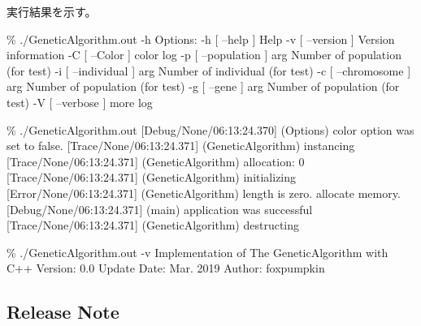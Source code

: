 実行結果を示す。


\begin{DoxyPre}
\% ./GeneticAlgorithm.out -h
Options:
  -h [ --help ]           Help
  -v [ --version ]        Version information
  -C [ --Color ]          color log
  -p [ --population ] arg Number of population (for test)
  -i [ --individual ] arg Number of individual (for test)
  -c [ --chromosome ] arg Number of population (for test)
  -g [ --gene ] arg       Number of population (for test)
  -V [ --verbose ]        more log
\end{DoxyPre}



\begin{DoxyPre}
\% ./GeneticAlgorithm.out
[Debug/None/06:13:24.370] (Options) color option was set to false.
[Trace/None/06:13:24.371] (GeneticAlgorithm) instancing
[Trace/None/06:13:24.371] (GeneticAlgorithm) allocation: 0
[Trace/None/06:13:24.371] (GeneticAlgorithm) initializing
[Error/None/06:13:24.371] (GeneticAlgorithm) length is zero. allocate memory.
[Debug/None/06:13:24.371] (main) application was successful
[Trace/None/06:13:24.371] (GeneticAlgorithm) destructing
\end{DoxyPre}



\begin{DoxyPre}
\% ./GeneticAlgorithm.out -v
Implementation of The GeneticAlgorithm with C++
     Version: 0.0
 Update Date: Mar. 2019
      Author: foxpumpkin
\end{DoxyPre}


\subsection*{Release Note}

